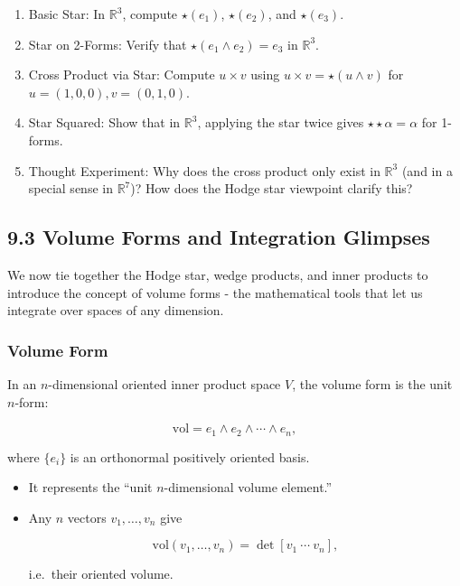 \documentclass[
  letterpaper,
  DIV=11,
  numbers=noendperiod]{scrreprt}
\begin{document}
\begin{enumerate}
\def\labelenumi{\arabic{enumi}.}
\item
  Basic Star: In \(\mathbb{R}^3\), compute \(\star (e_1)\),
  \(\star (e_2)\), and \(\star (e_3)\).
\item
  Star on 2-Forms: Verify that \(\star (e_1 \wedge e_2) = e_3\) in
  \(\mathbb{R}^3\).
\item
  Cross Product via Star: Compute \(u \times v\) using
  \(u \times v = \star (u \wedge v)\) for \(u=(1,0,0), v=(0,1,0)\).
\item
  Star Squared: Show that in \(\mathbb{R}^3\), applying the star twice
  gives \(\star \star \alpha = \alpha\) for 1-forms.
\item
  Thought Experiment: Why does the cross product only exist in
  \(\mathbb{R}^3\) (and in a special sense in \(\mathbb{R}^7\))? How
  does the Hodge star viewpoint clarify this?
\end{enumerate}

\subsection{9.3 Volume Forms and Integration
Glimpses}\label{volume-forms-and-integration-glimpses}

We now tie together the Hodge star, wedge products, and inner products
to introduce the concept of volume forms - the mathematical tools that
let us integrate over spaces of any dimension.

\subsubsection{Volume Form}\label{volume-form}

In an \(n\)-dimensional oriented inner product space \(V\), the volume
form is the unit \(n\)-form:

\[
\mathrm{vol} = e_1 \wedge e_2 \wedge \cdots \wedge e_n,
\]

where \(\{e_i\}\) is an orthonormal positively oriented basis.

\begin{itemize}
\item
  It represents the ``unit \(n\)-dimensional volume element.''
\item
  Any \(n\) vectors \(v_1,\dots,v_n\) give

  \[
  \mathrm{vol}(v_1,\dots,v_n) = \det[v_1 \ \cdots \ v_n],
  \]

  i.e.~their oriented volume.
\end{itemize}
\end{document}
